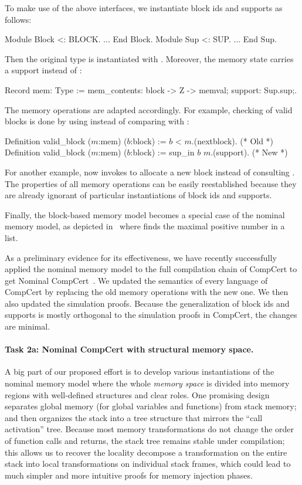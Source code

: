 To make use of the above interfaces, we instantiate block ids and
supports as follows:
%
\begin{coq}
  Module Block <: BLOCK. ... End Block.           Module Sup <: SUP. ... End Sup.
\end{coq}
%
Then the original  type is instantiated with
. Moreover, the memory state carries a support instead of
\nextblock:
%
\begin{coq}
  Record mem: Type := { mem_contents: block -> Z -> memval;   support: Sup.sup;}.
\end{coq}
%
The memory operations are adapted accordingly. For example, checking
of valid blocks is done by using  instead of comparing
with \nextblock:
%
\begin{coq}
  Definition valid_block ($m$:mem) ($b$:block) := $b$ < $m$.(nextblock).   (* Old *)
  Definition valid_block ($m$:mem) ($b$:block) := sup_in $b$ $m$.(support).  (* New *)
\end{coq}
%
For another example,  now invokes  to
allocate a new block instead of consulting \nextblock.
The properties of all memory operations can be easily reestablished
because they are already ignorant of particular instantiations of block ids
and supports. 

Finally, the block-based memory model becomes a special case of the
nominal memory model, as depicted in~ where
 finds the maximal positive number in a list.

As a preliminary evidence for its effectiveness, we have recently
successfully applied the nominal memory model to the full compilation
chain of CompCert to get Nominal CompCert~\cite{wang2022}.  We updated
the semantics of every language of CompCert by replacing the old
memory operations with the new one. We then also updated the
simulation proofs. Because the generalization of block ids and
supports is mostly orthogonal to the simulation proofs in CompCert,
the changes are minimal.

\paragraph*{Task 2a: Nominal CompCert with structural memory space.}
A big part of our proposed effort is to develop various instantiations
of the nominal memory model where the whole {\em memory space} is
divided into memory regions with well-defined structures and clear
roles. One promising design~\cite{wang2022} separates global memory
(for global variables and functions) from stack memory; and then
organizes the stack into a tree structure that mirrors the ``call
activation'' tree.  Because most memory transformations do not change
the order of function calls and returns, the stack tree remains stable
under compilation; this allows us to recover the locality decompose a
transformation on the entire stack into local transformations on
individual stack frames, which could lead to much simpler and more
intuitive proofs for memory injection phases.

